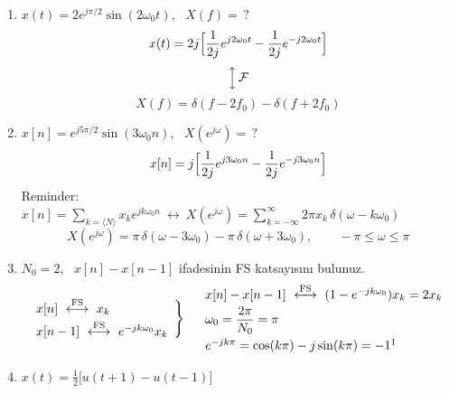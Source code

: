 \documentclass[11pt,a4paper]{article}
\begin{document}
\begin{enumerate}[label=\arabic*), start=4]
  \item $x(t)=2e^{j\pi/2}\sin(2\omega_0t)$, \ $X(f)=\,?$
    \[ x(t)=2j\Bigl[\frac{1}{2j}e^{j2\omega_0t}-\frac{1}{2j}e^{-j2\omega_0t}\Bigr] \]
    \[ \Big\updownarrow\,\mathcal{F} \]
    \[ X(f)=\delta(f-2f_0)-\delta(f+2f_0) \]
  \item $x[n]=e^{j5\pi/2}\sin(3\omega_0n)$, \ $X(e^{j\omega})=\,?$
    \[ x[n]=j\Bigl[\frac{1}{2j}e^{j3\omega_0n}-\frac{1}{2j}e^{-j3\omega_0n}\Bigr] \]
    Reminder: \quad $x[n]=\displaystyle\sum_{k=\langle N\rangle}x_ke^{jk\omega_0n}\ \longleftrightarrow\ X(e^{j\omega})=\sum_{k=-\infty}^{\infty}2\pi x_k\,\delta(\omega-k\omega_0)$
    \[ X(e^{j\omega})=\pi\,\delta(\omega-3\omega_0)-\pi\,\delta(\omega+3\omega_0),\qquad -\pi\leq\omega\leq\pi \]
  \item $N_0=2$, \ $x[n]-x[n-1]$ ifadesinin FS katsayısını bulunuz.
    \[
      \left.
      \begin{array}{l}
        x[n]\ \overset{\text{FS}}{\longleftrightarrow}\ x_k\\[1mm]
        x[n-1]\ \overset{\text{FS}}{\longleftrightarrow}\ e^{-jk\omega_0}x_k
      \end{array}
      \right\}\quad
      \begin{array}{l}
        x[n]-x[n-1]\ \overset{\text{FS}}{\longleftrightarrow}\ (1-e^{-jk\omega_0})x_k=2x_k\\[1mm]
        \omega_0=\dfrac{2\pi}{N_0}=\pi\\[3mm]
        e^{-jk\pi}=\cos(k\pi)-j\sin(k\pi)=-1\text{\footnotemark}
      \end{array}
    \]
  \item $x(t)=\frac12\bigl[u(t+1)-u(t-1)\bigr]$\par
    \hspace{1cm}
    \begin{minipage}[b]{0.55\linewidth}

\end{minipage}
\end{enumerate}
\end{document}
